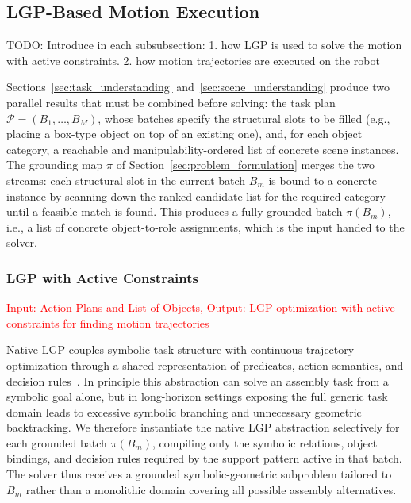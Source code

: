 \documentclass[journal]{IEEEtran}
\newcommand{\todo}[1]{{\color{red}TODO: #1}}
\begin{document}
\subsection{LGP-Based Motion Execution}
\label{sec:motion_execution}

\todo{Introduce in each subsubsection: 1. how LGP is used to solve the motion with active constraints. 2. how motion trajectories are executed on the robot}

Sections~\ref{sec:task_understanding} and~\ref{sec:scene_understanding}
produce two parallel results that must be combined before solving: the task
plan $\mathcal{P}=(B_1,\dots,B_M)$, whose batches specify the structural
slots to be filled (e.g., placing a box-type object on top of an existing
one), and, for each object category, a reachable and manipulability-ordered
list of concrete scene instances. The grounding map $\pi$ of
Section~\ref{sec:problem_formulation} merges the two streams: each structural
slot in the current batch $B_m$ is bound to a concrete instance by scanning
down the ranked candidate list for the required category until a feasible
match is found. This produces a fully grounded batch $\pi(B_m)$, i.e., a list
of concrete object-to-role assignments, which is the input handed to the
solver.

\subsubsection{LGP with Active Constraints}
\textcolor{red}{Input: Action Plans and List of Objects, Output: LGP optimization with active constraints for finding motion trajectories}

Native LGP couples symbolic task structure with continuous trajectory
optimization through a shared representation of predicates, action semantics,
and decision rules~\cite{cite_lgp_2015}. In principle this abstraction can
solve an assembly task from a symbolic goal alone, but in long-horizon
settings exposing the full generic task domain leads to excessive symbolic
branching and unnecessary geometric backtracking. We therefore instantiate
the native LGP abstraction selectively for each grounded batch $\pi(B_m)$,
compiling only the symbolic relations, object bindings, and decision rules
required by the support pattern active in that batch. The solver thus
receives a grounded symbolic-geometric subproblem tailored to $B_m$ rather
than a monolithic domain covering all possible assembly alternatives.
\end{document}
